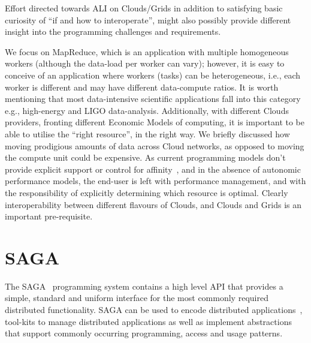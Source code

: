 \documentclass[conference,final]{IEEEtran}
\newcommand{\jhanote}[1]{ {\textcolor{red} { ***SJ: #1 }}}
\newcommand{\jhanote}[1]{}
\begin{document}
Effort directed towards ALI on Clouds/Grids in addition to satisfying
basic curiosity of ``if and how to interoperate'', might also possibly
provide different insight into the programming challenges and
requirements.



We focus on MapReduce, which is an application with multiple
homogeneous workers (although the data-load per worker can vary);
however, it is easy to conceive of an application where workers
(tasks) can be heterogeneous, i.e., each worker is different and may
have different data-compute ratios.  It is worth mentioning that most
data-intensive scientific applications fall into this category e.g.,
high-energy and LIGO data-analysis.  Additionally, with different
Clouds providers, fronting different Economic Models of computing, it
is important to be able to utilise the ``right resource'', in the
right way. We briefly discussed how moving prodigious amounts of data
across Cloud networks, as opposed to moving the compute unit could be
expensive.  As current programming models don't provide explicit
support or control for affinity~\cite{jha_ccpe09}, and in the absence
of autonomic performance models, the end-user is left with performance
management, and with the responsibility of explicitly determining
which resource is optimal. Clearly interoperability between different
flavours of Clouds, and Clouds and Grids is an important
pre-requisite.


\section{SAGA}

The SAGA~\cite{saga-core} programming system contains a high level API
that provides a simple, standard and uniform interface for the most
commonly required distributed functionality.  SAGA can be used to
encode distributed applications~\cite{saga_escience07_short,
  saga_tg08}, tool-kits to manage distributed applications as well as
implement abstractions that support commonly occurring programming,
access and usage patterns.
\end{document}
